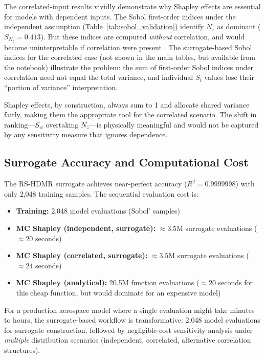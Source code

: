 \documentclass[11pt,a4paper]{article}
\begin{document}
The correlated-input results vividly demonstrate why Shapley effects are essential for models with dependent inputs. The Sobol first-order indices under the independent assumption (Table~\ref{tab:sobol_validation}) identify $N_z$ as dominant ($S_{N_z} = 0.413$). But these indices are computed \emph{without} correlation, and would become uninterpretable if correlation were present \cite{Iooss2019}. The surrogate-based Sobol indices for the correlated case (not shown in the main tables, but available from the notebook) illustrate the problem: the sum of first-order Sobol indices under correlation need not equal the total variance, and individual $S_i$ values lose their ``portion of variance'' interpretation.

Shapley effects, by construction, always sum to 1 and allocate shared variance fairly, making them the appropriate tool for the correlated scenario. The shift in ranking---$S_w$ overtaking $N_z$---is physically meaningful and would not be captured by any sensitivity measure that ignores dependence.

\subsection{Surrogate Accuracy and Computational Cost}

The RS-HDMR surrogate achieves near-perfect accuracy ($R^2 = 0.9999998$) with only 2,048 training samples. The sequential evaluation cost is:

\begin{itemize}[nosep]
    \item \textbf{Training:} 2,048 model evaluations (Sobol' samples)
    \item \textbf{MC Shapley (independent, surrogate):} $\approx 3.5$M surrogate evaluations ($\approx 20$ seconds)
    \item \textbf{MC Shapley (correlated, surrogate):} $\approx 3.5$M surrogate evaluations ($\approx 24$ seconds)
    \item \textbf{MC Shapley (analytical):} 20.5M function evaluations ($\approx 20$ seconds for this cheap function, but would dominate for an expensive model)
\end{itemize}

For a production aerospace model where a single evaluation might take minutes to hours, the surrogate-based workflow is transformative: 2,048 model evaluations for surrogate construction, followed by negligible-cost sensitivity analysis under \emph{multiple} distribution scenarios (independent, correlated, alternative correlation structures).
\end{document}
